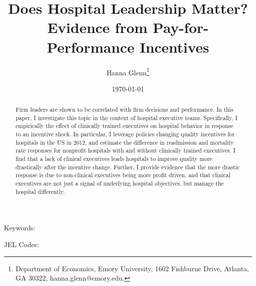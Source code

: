 \documentclass[12pt]{article}
\begin{document}
	
	
	
	
	\linespread{1.2}\title{\vspace{-0.5in} Does Hospital Leadership Matter?\\ \large Evidence from Pay-for-Performance Incentives} 
	
	\date{\today}
	
	\author{\vspace{10mm}Hanna Glenn\footnote{Department of Economics, Emory University, 1602 Fishburne Drive, Atlanta, GA 30322, hanna.glenn@emory.edu.} }
	
	\maketitle
	
	\vspace{-0.2in}
	
	\singlespacing\maketitle


 \vspace{3mm}
	
    \begin{abstract}
		{\small
         Firm leaders are shown to be correlated with firm decisions and performance. In this paper, I investigate this topic in the context of hospital executive teams. Specifically, I empirically the effect of clinically trained executives on hospital behavior in response to an incentive shock. In particular, I leverage policies changing quality incentives for hospitals in the US in 2012, and estimate the difference in readmission and mortality rate responses for nonprofit hospitals with and without clinically trained executives. I find that a lack of clinical executives leads hospitals to improve quality more drastically after the incentive change. Further, I provide evidence that the more drastic response is due to non-clinical executives being more profit driven, and that clinical executives are not just a signal of underlying hospital objectives, but manage the hospital differently. 
		} 
	\end{abstract}
	
	
	
	
	\vspace{0.8in}
	
	\noindent Keywords: 
	
	\noindent JEL Codes: 
	
\end{document}
